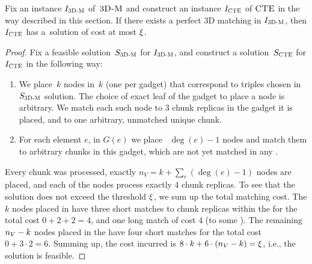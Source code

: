 \begin{lemma}
  Fix an instance $I_{\mathrm{\textsc{3D-M}}}$ of~$\textsc{3D-M}$ and construct an instance $I_{\mathrm{\textsc{CTE}}}$ of $\textsc{CTE}$ in the way described in this section.
  If there exists a perfect 3D matching in $I_{\mathrm{\textsc{3D-M}}}$, then $I_{\mathrm{\textsc{CTE}}}$ has a~solution of cost at most $\xi$.
    \label{lem:ma-reduction-left}
\end{lemma}
\begin{proof}
  Fix a feasible solution~$S_{\mathrm{\textsc{3D-M}}}$ for $I_{\mathrm{\textsc{3D-M}}}$, and construct a solution~$S_{\mathrm{\textsc{CTE}}}$ for $I_{\mathrm{\textsc{CTE}}}$ in the following way:
  \begin{enumerate}
    \item We place~$k$ nodes in~$k$ {\TripleGadgets} (one per gadget) that correspond to triples chosen in~$S_{\mathrm{\textsc{3D-M}}}$ solution.
    The choice of exact leaf of the gadget to place a node is arbitrary.
    We match each such node to $3$ chunk replicas in the gadget it is placed, and to one arbitrary, unmatched unique chunk.
    \item For each element $e$, in $G(e)$ we place
   ~$\deg(e) - 1$ nodes and match them to arbitrary chunks in this
    gadget, which are not yet matched in any {\TripleGadget}.
  \end{enumerate}

  Every chunk was processed, exactly $n_V = k + \sum_e(\deg(e) - 1)$ nodes are placed, and each of the nodes process exactly $4$ chunk replicas.
  To see that the solution does not exceed the threshold $\xi$, we sum up the total matching cost.
  The $k$ nodes placed in \TripleGadgets{} have three short matches to chunk replicas within the \TripleGadget{} for the total cost $0+2+2=4$, and one long match of cost $4$ (to some \UnqGadget{}).
  The remaining $n_V-k$ nodes placed in the \CoverSubtree{} have four short matches for the total cost $0+3\cdot 2 = 6$.
  Summing up, the cost incurred is $8\cdot k + 6\cdot (n_V - k) = \xi$, i.e., the solution is feasible.
\end{proof}


